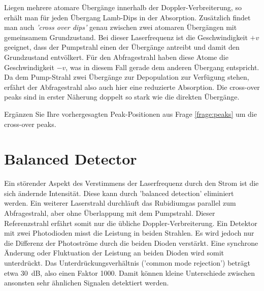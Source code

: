 Liegen mehrere atomare Übergänge innerhalb der Doppler-Verbreiterung, so erhält man für jeden Übergang Lamb-Dips in der Absorption. Zusätzlich findet man auch \emph{'cross over dips'} genau zwischen zwei atomaren Übergängen mit gemeinsamem Grundzustand. Bei dieser Laserfrequenz ist die Geschwindigkeit $+v$ geeignet, dass der Pumpstrahl einen der Übergänge antreibt und damit den Grundzustand entvölkert. Für den Abfragestrahl haben diese Atome die Geschwindigkeit $-v$, was in diesem Fall gerade dem anderen Übergang entspricht. Da dem Pump-Strahl zwei Übergänge zur Depopulation zur Verfügung stehen, erfährt der  Abfragestrahl  also auch hier eine reduzierte Absorption. Die cross-over peaks sind in erster Näherung doppelt so stark wie die direkten Übergänge.


\begin{questions}
	\item Ergänzen Sie Ihre vorhergesagten Peak-Positionen aus Frage \ref{frage:peaks} um die cross-over peaks.
\end{questions}
	

\section{Balanced Detector}

Ein störender Aspekt des Verstimmens der Laserfrequenz durch den Strom ist die sich ändernde Intensität. Diese kann durch 'balanced detection' eliminiert werden. Ein weiterer Laserstrahl durchläuft das Rubidiumgas parallel zum Abfragestrahl, aber ohne Überlappung mit dem Pumpstrahl. Dieser Referenzstrahl erfährt somit nur die übliche Doppler-Verbreiterung. Ein Detektor mit zwei Photodioden misst die Leistung in beiden Strahlen. Es wird jedoch nur die Differenz der Photoströme durch die beiden Dioden verstärkt. Eine synchrone Änderung oder Fluktuation der Leistung an beiden Dioden wird somit unterdrückt. Das Unterdrückungsverhältnis ('common mode rejection') beträgt etwa 30~dB, also einen Faktor 1000. Damit können kleine Unterschiede zwischen ansonsten sehr ähnlichen Signalen detektiert werden.

